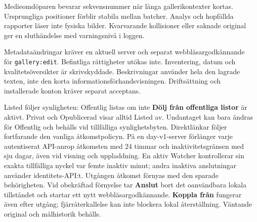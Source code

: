 \documentclass[11pt,a4paper]{article}
\newcommand{\ui}[1]{\textbf{#1}}
\begin{document}
Medieomdöparen bevarar sekvensnummer när långa gallerikontexter kortas.
Ursprungliga positioner förblir stabila mellan batcher. Analys och hopfällda
rapporter läser inte fysiska bilder. Kvarvarande kollisioner eller saknade
original ger en sluthändelse med varningsnivå i loggen.

Metadataändringar kräver en aktuell server och separat webbläsargodkännande
för \texttt{gallery:edit}. Befintliga rättigheter utökas inte. Inventering,
datum och kvalitetsöversikter är skrivskyddade. Beskrivningar använder hela den
lagrade texten, inte den korta informationsförhandsvisningen. Driftsättning och
installerade konton kräver separat acceptans.

Listed följer synligheten: Offentlig listas om inte \ui{Dölj från offentliga
listor} är aktivt. Privat och Opublicerad visar alltid Listed av. Undantaget
kan bara ändras för Offentlig och behålls vid tillfälliga synlighetsbyten.
Direktlänkar följer fortfarande den vanliga åtkomstpolicyn.
På en day-v1-server förlänger varje autentiserat API-anrop åtkomsten med
24 timmar och inaktivitetsgränsen med sju dagar, även vid visning och uppladdning.
En aktiv Watcher kontrollerar sin exakta tillfälliga nyckel var femte inaktiv
minut; andra inaktiva anslutningar använder identitets-API:t. Utgången åtkomst
förnyas med den sparade behörigheten. Vid obekräftad förnyelse tar \ui{Anslut}
bort det oanvändbara lokala tillståndet och startar ett nytt webbläsargodkännande.
\ui{Koppla från} fungerar även efter utgång; fjärråterkallelse kan inte blockera
lokal återställning. Väntande original och målhistorik behålls.
\end{document}
